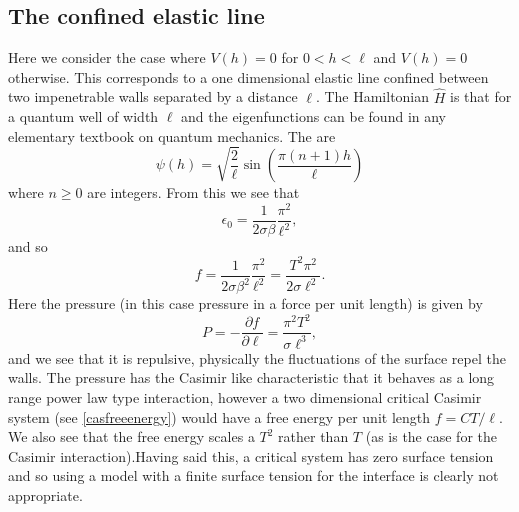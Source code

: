 \subsection{The confined elastic line}
Here we consider the case where $V(h)= 0$ for $0<h<\ell$ and $V(h)=0$ otherwise. This corresponds to a one dimensional elastic line confined between two impenetrable walls separated by a distance $\ell$. The Hamiltonian $\hat H$ is that for a quantum well of width $\ell$ and the eigenfunctions can be found in any elementary textbook on quantum mechanics. The are
\begin{equation}
\psi(h) = \sqrt{\frac{2}{\ell}}\sin(\frac{\pi(n+1)h}{\ell})
\end{equation}
where $n\geq 0$ are integers. From this we see that
\begin{equation}
\epsilon_0 = \frac{1}{2\sigma\beta}\frac{\pi^2}{\ell^2},
\end{equation}
and so
\begin{equation}
f = \frac{1}{2\sigma\beta^2}\frac{\pi^2}{\ell^2}= \frac{T^2\pi^2}{2\sigma\ell^2}.
\end{equation}
Here the pressure (in this case pressure in a force per unit length) is given by
\begin{equation}
P = -\frac{\partial f}{\partial \ell} = \frac{\pi^2 T^2}{\sigma\ell^3},\label{pfree}
\end{equation}
and we see that it is repulsive, physically the fluctuations of the surface repel the walls. 
The pressure has the Casimir like characteristic that it behaves as a long range power law type interaction, however a two dimensional critical Casimir system (see \eqref{casfreeenergy}) would have a free energy per unit length $f=CT/\ell$. We also see that the free energy scales  a $T^2$ rather than $T$ (as is the case for the Casimir interaction).Having said this, a critical system has zero surface tension and so using a model with a finite
surface tension for the interface is clearly not appropriate.

